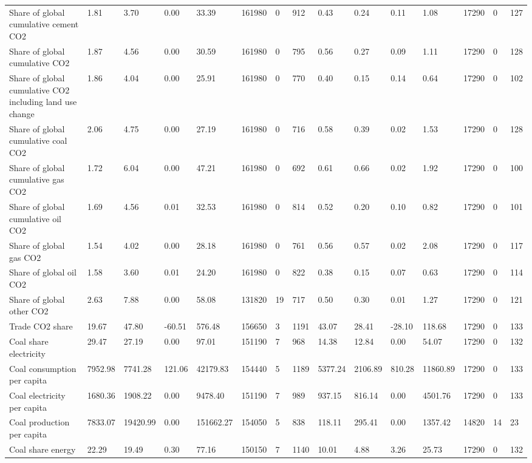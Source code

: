 \begin{longtable}{lllllllllllllll}
\addlinespace
Share of global cumulative cement CO2 & 1.81 & 3.70 & 0.00 & 33.39 & 161980 & 0 & 912 & 0.43 & 0.24 & 0.11 & 1.08 & 17290 & 0 & 127\\
Share of global cumulative CO2 & 1.87 & 4.56 & 0.00 & 30.59 & 161980 & 0 & 795 & 0.56 & 0.27 & 0.09 & 1.11 & 17290 & 0 & 128\\
Share of global cumulative CO2 including land use change & 1.86 & 4.04 & 0.00 & 25.91 & 161980 & 0 & 770 & 0.40 & 0.15 & 0.14 & 0.64 & 17290 & 0 & 102\\
Share of global cumulative coal CO2 & 2.06 & 4.75 & 0.00 & 27.19 & 161980 & 0 & 716 & 0.58 & 0.39 & 0.02 & 1.53 & 17290 & 0 & 128\\
Share of global cumulative gas CO2 & 1.72 & 6.04 & 0.00 & 47.21 & 161980 & 0 & 692 & 0.61 & 0.66 & 0.02 & 1.92 & 17290 & 0 & 100\\
\addlinespace
Share of global cumulative oil CO2 & 1.69 & 4.56 & 0.01 & 32.53 & 161980 & 0 & 814 & 0.52 & 0.20 & 0.10 & 0.82 & 17290 & 0 & 101\\
Share of global gas CO2 & 1.54 & 4.02 & 0.00 & 28.18 & 161980 & 0 & 761 & 0.56 & 0.57 & 0.02 & 2.08 & 17290 & 0 & 117\\
Share of global oil CO2 & 1.58 & 3.60 & 0.01 & 24.20 & 161980 & 0 & 822 & 0.38 & 0.15 & 0.07 & 0.63 & 17290 & 0 & 114\\
Share of global other CO2 & 2.63 & 7.88 & 0.00 & 58.08 & 131820 & 19 & 717 & 0.50 & 0.30 & 0.01 & 1.27 & 17290 & 0 & 121\\
Trade CO2 share & 19.67 & 47.80 & -60.51 & 576.48 & 156650 & 3 & 1191 & 43.07 & 28.41 & -28.10 & 118.68 & 17290 & 0 & 133\\
\addlinespace
Coal share electricity & 29.47 & 27.19 & 0.00 & 97.01 & 151190 & 7 & 968 & 14.38 & 12.84 & 0.00 & 54.07 & 17290 & 0 & 132\\
Coal consumption per capita & 7952.98 & 7741.28 & 121.06 & 42179.83 & 154440 & 5 & 1189 & 5377.24 & 2106.89 & 810.28 & 11860.89 & 17290 & 0 & 133\\
Coal electricity per capita & 1680.36 & 1908.22 & 0.00 & 9478.40 & 151190 & 7 & 989 & 937.15 & 816.14 & 0.00 & 4501.76 & 17290 & 0 & 133\\
Coal production per capita & 7833.07 & 19420.99 & 0.00 & 151662.27 & 154050 & 5 & 838 & 118.11 & 295.41 & 0.00 & 1357.42 & 14820 & 14 & 23\\
Coal share energy & 22.29 & 19.49 & 0.30 & 77.16 & 150150 & 7 & 1140 & 10.01 & 4.88 & 3.26 & 25.73 & 17290 & 0 & 132\\

\end{longtable}
